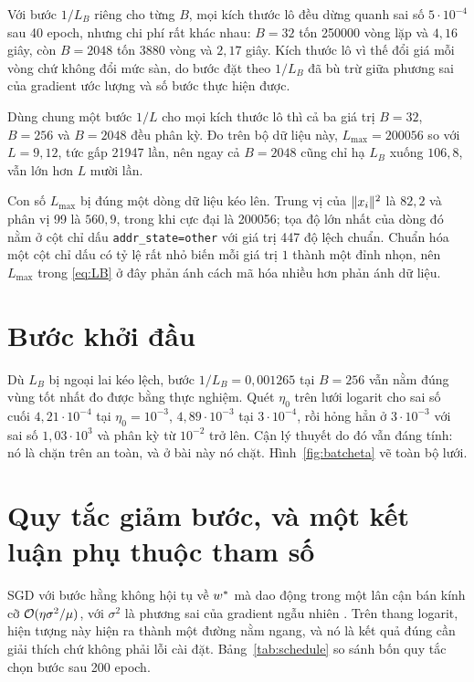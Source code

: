 \documentclass[12pt, a4paper, oneside]{report}
\theoremstyle{definition}
\begin{document}
Với bước $1/L_{B}$ riêng cho từng $B$, mọi kích thước lô đều dừng quanh sai số
$5 \cdot 10^{-4}$ sau 40 epoch, nhưng chi phí rất khác nhau: $B = 32$ tốn
\num{250000} vòng lặp và $4{,}16$ giây, còn $B = 2048$ tốn 3880 vòng và $2{,}17$
giây. Kích thước lô vì thế đổi giá mỗi vòng chứ không đổi mức sàn, do bước đặt
theo $1/L_{B}$ đã bù trừ giữa phương sai của gradient ước lượng và số bước thực
hiện được.

Dùng chung một bước $1/L$ cho mọi kích thước lô thì cả ba giá trị $B = 32$,
$B = 256$ và $B = 2048$ đều phân kỳ. Đo trên bộ dữ liệu này,
$L_{\max} = \num{200056}$ so với $L = 9{,}12$, tức gấp \num{21947} lần, nên ngay
cả $B = 2048$ cũng chỉ hạ $L_{B}$ xuống $106{,}8$, vẫn lớn hơn $L$ mười lần.

Con số $L_{\max}$ bị đúng một dòng dữ liệu kéo lên. Trung vị của $\lVert x_i\rVert^{2}$
là $82{,}2$ và phân vị 99 là $560{,}9$, trong khi cực đại là \num{200056}; tọa độ
lớn nhất của dòng đó nằm ở cột chỉ dấu \texttt{addr\_state=other} với giá trị 447
độ lệch chuẩn. Chuẩn hóa một cột chỉ dấu có tỷ lệ rất nhỏ biến mỗi giá trị $1$
thành một đỉnh nhọn, nên $L_{\max}$ trong \eqref{eq:LB} ở đây phản ánh cách mã hóa nhiều hơn phản ánh
dữ liệu.


\section{Bước khởi đầu}

Dù $L_{B}$ bị ngoại lai kéo lệch, bước $1/L_{B} = 0{,}001265$ tại $B = 256$ vẫn
nằm đúng vùng tốt nhất đo được bằng thực nghiệm. Quét $\eta_{0}$ trên lưới
logarit cho sai số cuối $4{,}21 \cdot 10^{-4}$ tại $\eta_{0} = 10^{-3}$,
$4{,}89 \cdot 10^{-3}$ tại $3 \cdot 10^{-4}$, rồi hỏng hẳn ở $3 \cdot 10^{-3}$
với sai số $1{,}03 \cdot 10^{3}$ và phân kỳ từ $10^{-2}$ trở lên. Cận lý thuyết
do đó vẫn đáng tính: nó là chặn trên an toàn, và ở bài này nó chặt.
Hình~\ref{fig:batcheta} vẽ toàn bộ lưới.


\section{Quy tắc giảm bước, và một kết luận phụ thuộc tham số}

SGD với bước hằng không hội tụ về $w^{*}$ mà dao động trong một lân cận bán kính
cỡ $\mathcal{O}(\eta \sigma^{2} / \mu)$, với $\sigma^{2}$ là phương sai của gradient
ngẫu nhiên \cite{bottou2018optimization}. Trên thang logarit, hiện tượng này hiện
ra thành một đường nằm ngang, và nó là kết quả đúng cần giải thích chứ không phải
lỗi cài đặt. Bảng~\ref{tab:schedule} so sánh bốn quy tắc chọn bước sau 200 epoch.
\end{document}
